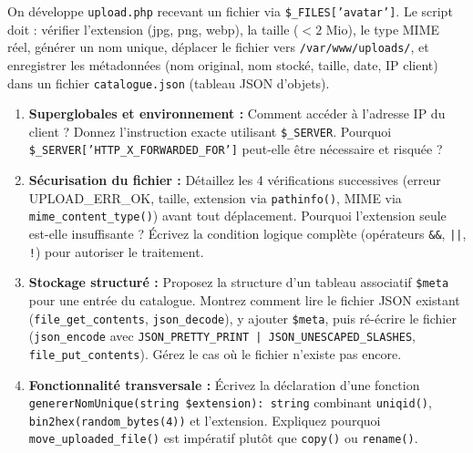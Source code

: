 \documentclass[11pt]{article}
\begin{document}
\begin{exercice}
On développe \texttt{upload.php} recevant un fichier via \texttt{\$\_FILES['avatar']}. Le script doit : vérifier l'extension (jpg, png, webp), la taille ($< 2$ Mio), le type MIME réel, générer un nom unique, déplacer le fichier vers \texttt{/var/www/uploads/}, et enregistrer les métadonnées (nom original, nom stocké, taille, date, IP client) dans un fichier \texttt{catalogue.json} (tableau JSON d'objets).

\begin{enumerate}
    \item \textbf{Superglobales et environnement :} Comment accéder à l'adresse IP du client ? Donnez l'instruction exacte utilisant \texttt{\$\_SERVER}. Pourquoi \texttt{\$\_SERVER['HTTP\_X\_FORWARDED\_FOR']} peut-elle être nécessaire et risquée ?
    \item \textbf{Sécurisation du fichier :} Détaillez les 4 vérifications successives (erreur UPLOAD\_ERR\_OK, taille, extension via \texttt{pathinfo()}, MIME via \texttt{mime\_content\_type()}) avant tout déplacement. Pourquoi l'extension seule est-elle insuffisante ? Écrivez la condition logique complète (opérateurs \texttt{\&\&}, \texttt{||}, \texttt{!}) pour autoriser le traitement.
    \item \textbf{Stockage structuré :} Proposez la structure d'un tableau associatif \texttt{\$meta} pour une entrée du catalogue. Montrez comment lire le fichier JSON existant (\texttt{file\_get\_contents}, \texttt{json\_decode}), y ajouter \texttt{\$meta}, puis ré-écrire le fichier (\texttt{json\_encode} avec \texttt{JSON\_PRETTY\_PRINT | JSON\_UNESCAPED\_SLASHES}, \texttt{file\_put\_contents}). Gérez le cas où le fichier n'existe pas encore.
    \item \textbf{Fonctionnalité transversale :} Écrivez la déclaration d'une fonction \texttt{genererNomUnique(string \$extension): string} combinant \texttt{uniqid()}, \texttt{bin2hex(random\_bytes(4))} et l'extension. Expliquez pourquoi \texttt{move\_uploaded\_file()} est impératif plutôt que \texttt{copy()} ou \texttt{rename()}.
\end{enumerate}
\end{exercice}
\end{document}
